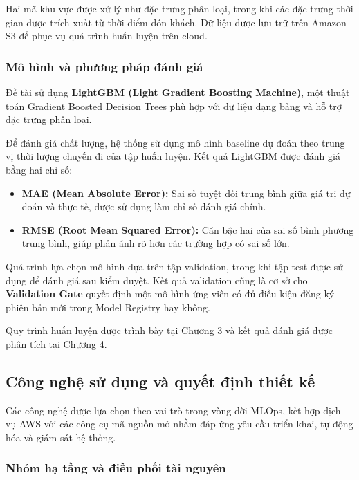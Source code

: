 Hai mã khu vực được xử lý như đặc trưng phân loại, trong khi các đặc trưng thời gian được trích xuất từ thời điểm đón khách. Dữ liệu được lưu trữ trên Amazon S3 để phục vụ quá trình huấn luyện trên cloud.


\subsubsection{Mô hình và phương pháp đánh giá}


Đề tài sử dụng \textbf{LightGBM (Light Gradient Boosting Machine)}, một thuật toán Gradient Boosted Decision Trees phù hợp với dữ liệu dạng bảng và hỗ trợ đặc trưng phân loại.


Để đánh giá chất lượng, hệ thống sử dụng mô hình baseline dự đoán theo trung vị thời lượng chuyến đi của tập huấn luyện. Kết quả LightGBM được đánh giá bằng hai chỉ số:


\begin{itemize}

\item 

\textbf{MAE (Mean Absolute Error):} Sai số tuyệt đối trung bình giữa giá trị dự đoán và thực tế, được sử dụng làm chỉ số đánh giá chính.


\item 

\textbf{RMSE (Root Mean Squared Error):} Căn bậc hai của sai số bình phương trung bình, giúp phản ánh rõ hơn các trường hợp có sai số lớn.


\end{itemize}

Quá trình lựa chọn mô hình dựa trên tập validation, trong khi tập test được sử dụng để đánh giá sau kiểm duyệt. Kết quả validation cũng là cơ sở cho \textbf{Validation Gate} quyết định một mô hình ứng viên có đủ điều kiện đăng ký phiên bản mới trong Model Registry hay không.


Quy trình huấn luyện được trình bày tại Chương 3 và kết quả đánh giá được phân tích tại Chương 4.


\subsection{Công nghệ sử dụng và quyết định thiết kế}


Các công nghệ được lựa chọn theo vai trò trong vòng đời MLOps, kết hợp dịch vụ AWS với các công cụ mã nguồn mở nhằm đáp ứng yêu cầu triển khai, tự động hóa và giám sát hệ thống.


\subsubsection{Nhóm hạ tầng và điều phối tài nguyên}



